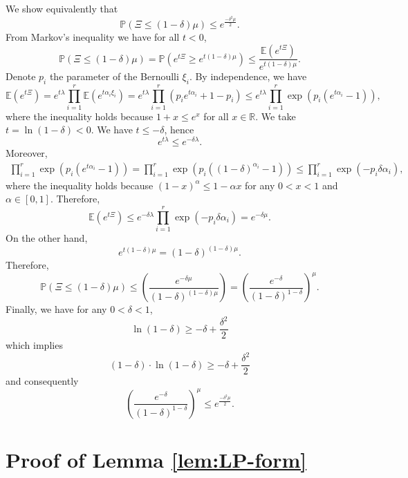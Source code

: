 \documentclass[moor]{informs1}              %
\begin{document}
\begin{APPENDICES}
We show equivalently that 
$$ \mathbb{P} ( \Xi \leq (1- \delta ) \mu ) \leq  e^{  \frac{-{\delta}^2 \mu}{2}}.$$
From Markov's inequality we have for all $t< 0$,
 $$ \mathbb{P}( \Xi \leq (1- \delta ) \mu ) = \mathbb{P}( e^{t\Xi} \geq e^{t(1-\delta)\mu} ) \leq \frac{\mathbb{E}(e^{t\Xi})}{e^{t(1-\delta) \mu}}.$$
 Denote $p_i$ the parameter of the Bernoulli ${\xi}_i$. By independence, we have
 $$  \mathbb{E}(e^{t\Xi})=  e^{t \lambda}    \prod_{i=1}^r \mathbb{E} (e^{t \alpha_i {\xi}_i}) = e^{t \lambda} \prod_{i=1}^r \left( p_i  e^{t \alpha_i }+1-p_i \right)
 \leq e^{t \lambda}  \prod_{i=1}^r \exp \left( p_i  (e^{t \alpha_i }-1) \right) ,$$
 where the inequality holds because $1+x \leq e^x$ for all $x \in \mathbb{R}$.
We take $t=\ln( 1- \delta) < 0$. We have $ t \leq - \delta$, hence
$$ e^{t \lambda} \leq e^{- \delta \lambda} .$$
Moreover,
 \begin{align*}
\prod_{i=1}^r \exp \left( p_i  (e^{ t\alpha_i }-1) \right)   =\prod_{i=1}^r \exp \left( p_i  ((1-\delta)^{ \alpha_i }-1) \right) 
\leq \prod_{i=1}^r \exp \left( -p_i  \delta \alpha_i \right),
 \end{align*}
where the  inequality holds because $ (1-x)^{\alpha} \leq 1- \alpha x$ for any $ 0 < x <1$ and $\alpha \in [0,1]$. Therefore,
 $$  \mathbb{E}(e^{t\Xi}) \leq      e^{- \delta \lambda}       \prod_{i=1}^r \exp \left( -p_i  \delta \alpha_i \right)   =          e^{-\delta \mu}. $$
On the other hand, $$e^{t(1-\delta) \mu} = (1-\delta) ^{(1-\delta)\mu}.$$
Therefore,
 $$ \mathbb{P}( \Xi \leq (1- \delta ) \mu ) \leq  \left(  \frac{e^{-\delta \mu}}{(1-\delta) ^{(1-\delta)\mu}} \right) =\left(  \frac{e^{-\delta}}{(1-\delta)^{1-\delta} }    \right)^{\mu}. $$
Finally, we have for any $0<\delta < 1$,
$$ \ln (1- \delta ) \geq  - \delta + \frac{\delta^2}{2}$$
which implies 
$$ (1- \delta) \cdot \ln (1- \delta ) \geq  - \delta + \frac{\delta^2}{2}$$
and consequently
$$\left(  \frac{e^{-\delta}}{(1-\delta)^{1-\delta} }    \right)^{\mu} \leq e^{  \frac{-{\delta}^2 \mu}{2}}. $$
\hfill
\Halmos
\endproof

\section{Proof of Lemma \ref{lem:LP-form}} \label{apx-LP}
\

\


\end{APPENDICES}
\end{document}
